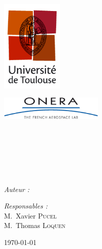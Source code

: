 
\begin{titlepage}

\begin{center}

\begin{minipage}[t]{0.48\textwidth}
  \begin{flushleft}
    \includegraphics [width=30mm]{images/logo_univ_tlse.png} \\[0.5cm]
  \end{flushleft}
\end{minipage}
\begin{minipage}[t]{0.48\textwidth}
  \begin{flushright}
    \includegraphics [width=50mm]{images/onera.png} 
  \end{flushright}
\end{minipage} \\[1.5cm]

\textsc{\Large \reportsubject}\\[0.5cm]
\HRule \\[0.4cm]
{\huge \bfseries \reporttitle}\\[0.4cm]
\HRule \\[1.5cm]

\begin{minipage}[t]{0.32\textwidth}
  \begin{flushleft} \large
    \emph{Auteur :}\\
    \reportauthor
  \end{flushleft}
\end{minipage}
\begin{minipage}[t]{0.6\textwidth}
  \begin{flushright} \large
    \emph{Responsables :} \\
    M.~Xavier \textsc{Pucel} \\
    M.~Thomas \textsc{Loquen}
  \end{flushright}
\end{minipage}

\vfill

{\large \today}

\end{center}

\end{titlepage}
